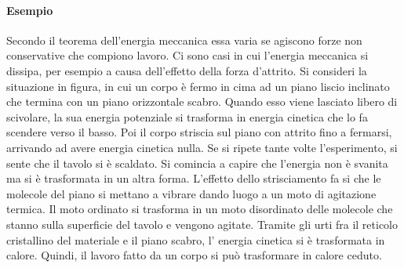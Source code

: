 \documentclass[10pt,a4paper]{book}
\begin{document}
\paragraph{Esempio} Secondo il teorema dell'energia meccanica essa varia se agiscono forze non conservative che compiono lavoro. Ci sono casi in cui l'energia meccanica si dissipa, per esempio a causa dell'effetto della forza d'attrito. Si consideri la situazione in figura, in cui un corpo è fermo in cima ad un piano liscio inclinato che termina con un piano orizzontale scabro. Quando esso viene lasciato libero di scivolare, la sua energia potenziale si trasforma in energia cinetica che lo fa scendere verso il basso. Poi il corpo striscia sul piano con attrito fino a fermarsi, arrivando ad avere energia cinetica nulla. Se si ripete tante volte l'esperimento, si sente che il tavolo si è scaldato. Si comincia a capire che l'energia non è svanita ma si è trasformata in un altra forma. L'effetto dello strisciamento fa si che le molecole del piano si mettano a vibrare dando luogo a un moto di agitazione termica. Il moto ordinato si trasforma in un moto disordinato delle molecole che stanno sulla superficie del tavolo e vengono agitate.
Tramite gli urti fra il reticolo cristallino del materiale e il piano scabro, l' energia cinetica si è trasformata in calore. Quindi, il lavoro fatto da un corpo si può trasformare in calore ceduto.
\end{document}
